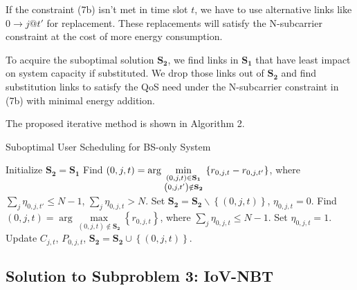 \documentclass[conference]{IEEEtran}
\begin{document}
If the constraint (7b) isn't met in time slot ${t}$, we have to use alternative links like $0 \to j@t'$ for replacement. These replacements will satisfy the N-subcarrier constraint at the cost of more energy consumption. 

To acquire the suboptimal solution ${{\mathbf{S}}_{\mathbf{2}}}$, we find links in ${{\mathbf{S}}_{\mathbf{1}}}$ that have least impact on system capacity if substituted. We drop those links out of ${{\mathbf{S}}_{\mathbf{2}}}$ and find substitution links to satisfy the QoS need under the N-subcarrier constraint in (7b) with minimal energy addition. 

The proposed iterative method is shown in Algorithm 2.

\begin{algorithm}[h]
\caption{Suboptimal User Scheduling for BS-only System}
\label{alg:1}
\begin{algorithmic}[1]
\STATE Initialize ${{\mathbf{S}}_{\mathbf{2}}}={{\mathbf{S}}_{\mathbf{1}}}$
  \STATE Find $\left( {0,j,t} \right) = \arg \mathop {\min }\limits_{\scriptstyle \left( {0,j,t} \right) \in {{\mathbf{S}}_{\mathbf{1}}} \atop
  \scriptstyle \left( {0,j,t'} \right) \notin {{\mathbf{S}}_{\mathbf{2}}}}  \left\{ {{r_{0,j,t}} - {r_{0,j,t'}}} \right\}$, where $\sum\limits_{j} {{\eta _{0,j,t'}}}  \le N - 1$, $\sum\limits_j {{\eta _{0,j,t}} > N} $.
  \STATE Set ${{\mathbf{S}}_{\mathbf{2}}}={{\mathbf{S}}_{\mathbf{2}}}\backslash \left\{ {\left( {0,j,t} \right)} \right\}$, ${\eta _{0,j,t}} = 0$.
    \STATE Find ${\left( {0,j,t} \right) = \arg \mathop {\max }\limits_{\left( {0,j,t} \right) \notin {{\mathbf{S}}_{\mathbf{2}}}} \left\{ {{r_{0,j,t}}} \right\}}$, where ${\sum\limits_j {{\eta _{0,j,t}}}  \le N - 1}$.
    \STATE Set ${\eta _{0,j,t}} = 1$.
    \STATE Update ${C_{j,t}}$, ${P_{0,j,t}}$, ${{\mathbf{S}}_{\mathbf{2}}}={{\mathbf{S}}_{\mathbf{2}}} \cup \left\{ {\left( {0,j,t} \right)} \right\}$.
  \ENDWHILE
\ENDWHILE
\end{algorithmic}
\end{algorithm}

\subsection{Solution to \textbf{Subproblem 3: IoV-NBT}}
\end{document}
